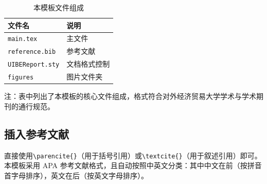 \documentclass[12pt,hyperref,a4paper,UTF8]{ctexart}
\begin{document}
\begin{table}[!htbp]
    \centering
    \begin{threeparttable}
    \caption{本模板文件组成}
    \label{doc}
    \begin{tabular*}{\textwidth}{@{\extracolsep{\fill}}ll}
    \toprule
        文件名 & 说明 \\
    \midrule
        \texttt{main.tex}  & 主文件 \\
        \texttt{reference.bib} & 参考文献 \\
        \texttt{UIBEReport.sty}  & 文档格式控制\\
        \texttt{figures}  & 图片文件夹 \\
    \bottomrule
    \end{tabular*}
    \begin{tablenotes}
        \item 注：表中列出了本模板的核心文件组成，格式符合对外经济贸易大学学术与学术期刊的通行规范。
    \end{tablenotes}
    \end{threeparttable}
\end{table}

%
%
%
%
%
%

\subsection{插入参考文献}
直接使用\verb|\parencite{}|（用于括号引用）或\verb|\textcite{}|（用于叙述引用）即可。本模板采用 APA 参考文献格式，且自动按照中英文分类：其中中文在前（按拼音首字母排序），英文在后（按英文字母排序）。
\end{document}
